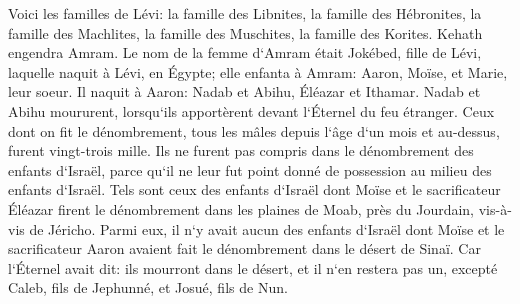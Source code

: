 \verse Voici les familles de Lévi: la famille des Libnites, la famille des Hébronites, la famille des Machlites, la famille des Muschites, la famille des Korites. Kehath engendra Amram. 
\verse Le nom de la femme d`Amram était Jokébed, fille de Lévi, laquelle naquit à Lévi, en Égypte; elle enfanta à Amram: Aaron, Moïse, et Marie, leur soeur. 
\verse Il naquit à Aaron: Nadab et Abihu, Éléazar et Ithamar. 
\verse Nadab et Abihu moururent, lorsqu`ils apportèrent devant l`Éternel du feu étranger. 
\verse Ceux dont on fit le dénombrement, tous les mâles depuis l`âge d`un mois et au-dessus, furent vingt-trois mille. Ils ne furent pas compris dans le dénombrement des enfants d`Israël, parce qu`il ne leur fut point donné de possession au milieu des enfants d`Israël. 
\verse Tels sont ceux des enfants d`Israël dont Moïse et le sacrificateur Éléazar firent le dénombrement dans les plaines de Moab, près du Jourdain, vis-à-vis de Jéricho. 
\verse Parmi eux, il n`y avait aucun des enfants d`Israël dont Moïse et le sacrificateur Aaron avaient fait le dénombrement dans le désert de Sinaï. 
\verse Car l`Éternel avait dit: ils mourront dans le désert, et il n`en restera pas un, excepté Caleb, fils de Jephunné, et Josué, fils de Nun. 

